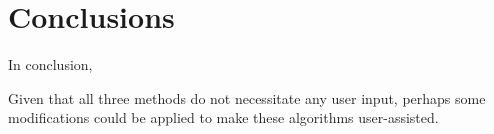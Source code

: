 \documentclass[11pt]{article}
\begin{document}
\section{Conclusions}
In conclusion,

Given that all three methods do not necessitate any user input, perhaps some modifications could be applied to make these algorithms user-assisted.  





\end{document}
